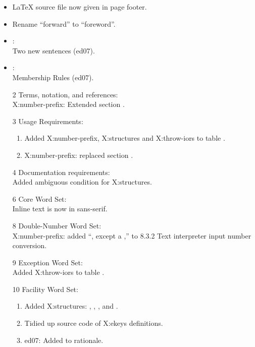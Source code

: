 	\begin{itemize}
	\item \LaTeX{} source file now given in page footer.

	\item Rename ``forward'' to ``foreword''.

	\item {}: \\
		Two new sentences (\textsf{ed07}).

	\item {}: \\
		Membership Rules (\textsf{ed07}).

	\item[2] Terms, notation, and references: \\
		\textsf{X:number-prefix}: Extended section
		.

	\item[3] Usage Requirements:
		\begin{enumerate}
		\item Added \textsf{X:number-prefix}, \textsf{X:structures}
			and \textsf{X:throw-iors} to table .
		\item \textsf{X:number-prefix}: replaced section
			.
		\end{enumerate}

	\item[4] Documentation requirements: \\
		Added ambiguous condition for \textsf{X:structures}.

	\item[6] Core Word Set: \\
		Inline text is now in sans-serif.

	\item[8] Double-Number Word Set: \\
		\textsf{X:number-prefix}: added ``, except a ,''
		to 8.3.2 Text interpreter input number conversion.

	\item[9] Exception Word Set: \\
		Added \textsf{X:throw-iors} to table .

	\item[10] Facility Word Set:
		\begin{enumerate}
		\item Added \textsf{X:structures}:
			,
			,
			,
			 and
			.
		\item Tidied up source code of \textsf{X:ekeys} definitions.
		\item \textsf{ed07}: Added to  rationale.
		\end{enumerate}


\end{itemize}
